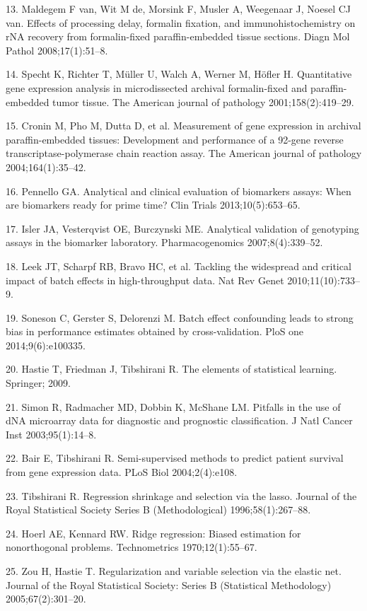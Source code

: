 \documentclass[11pt]{article}
\begin{document}
13. Maldegem F van, Wit M de, Morsink F, Musler A, Weegenaar J, Noesel
CJ van. Effects of processing delay, formalin fixation, and
immunohistochemistry on rNA recovery from formalin-fixed
paraffin-embedded tissue sections. Diagn Mol Pathol 2008;17(1):51--8.

14. Specht K, Richter T, M{ü}ller U, Walch A, Werner M, H{ö}fler H.
Quantitative gene expression analysis in microdissected archival
formalin-fixed and paraffin-embedded tumor tissue. The American journal
of pathology 2001;158(2):419--29.

15. Cronin M, Pho M, Dutta D, et al. Measurement of gene expression in
archival paraffin-embedded tissues: Development and performance of a
92-gene reverse transcriptase-polymerase chain reaction assay. The
American journal of pathology 2004;164(1):35--42.

16. Pennello GA. Analytical and clinical evaluation of biomarkers
assays: When are biomarkers ready for prime time? Clin Trials
2013;10(5):653--65.

17. Isler JA, Vesterqvist OE, Burczynski ME. Analytical validation of
genotyping assays in the biomarker laboratory. Pharmacogenomics
2007;8(4):339--52.

18. Leek JT, Scharpf RB, Bravo HC, et al. Tackling the widespread and
critical impact of batch effects in high-throughput data. Nat Rev Genet
2010;11(10):733--9.

19. Soneson C, Gerster S, Delorenzi M. Batch effect confounding leads to
strong bias in performance estimates obtained by cross-validation. PloS
one 2014;9(6):e100335.

20. Hastie T, Friedman J, Tibshirani R. The elements of statistical
learning. Springer; 2009.

21. Simon R, Radmacher MD, Dobbin K, McShane LM. Pitfalls in the use of
dNA microarray data for diagnostic and prognostic classification. J Natl
Cancer Inst 2003;95(1):14--8.

22. Bair E, Tibshirani R. Semi-supervised methods to predict patient
survival from gene expression data. PLoS Biol 2004;2(4):e108.

23. Tibshirani R. Regression shrinkage and selection via the lasso.
Journal of the Royal Statistical Society Series B (Methodological)
1996;58(1):267--88.

24. Hoerl AE, Kennard RW. Ridge regression: Biased estimation for
nonorthogonal problems. Technometrics 1970;12(1):55--67.

25. Zou H, Hastie T. Regularization and variable selection via the
elastic net. Journal of the Royal Statistical Society: Series B
(Statistical Methodology) 2005;67(2):301--20.
\end{document}
